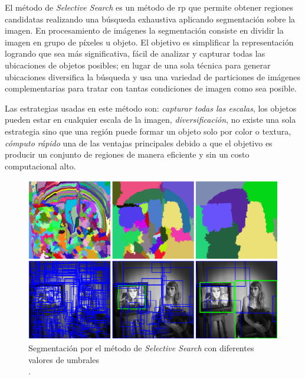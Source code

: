 El método de \textit{Selective Search} \citep{selectivesearch} es un método de \ac{rp} que  permite obtener regiones candidatas realizando una búsqueda exhaustiva aplicando segmentación sobre la imagen. En procesamiento de imágenes la segmentación consiste en dividir la imagen en grupo de píxeles u objeto. El objetivo es simplificar la representación logrando que sea más significativa, fácil de analizar y capturar todas las ubicaciones de objetos posibles; en lugar de una sola técnica para generar ubicaciones diversifica la  búsqueda y usa  una variedad de particiones de imágenes complementarias para tratar con tantas condiciones de imagen como sea posible.

Las estrategias usadas en este método son:  \textit{capturar todas las escalas}, los objetos pueden estar en cualquier escala de la imagen, \textit{diversificación}, no existe una sola estrategia sino que una región puede formar un objeto solo por color o textura, \textit{cómputo rápido} una de las ventajas principales debido a que el objetivo es producir un conjunto de regiones de manera eficiente y sin un costo computacional alto.

\begin{figure}[H]
 \centering
  \includegraphics[scale=0.4,keepaspectratio=true,clip=true]{imagenes/MarcoTeorico/selectivesearch.png}
  \caption{Segmentación por el método de \textit{Selective Search} con diferentes valores de umbrales \\ \citep{selectivesearch}.}
	\label{Fig: overlapping}
\end{figure}

